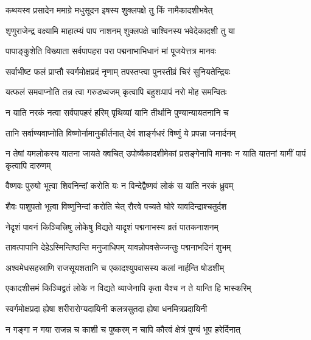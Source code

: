 \label{sec:padma-ashvina-shukla-pashankusha}



\twolineshloka
{कथयस्व प्रसादेन ममाग्रे मधुसूदन}
{इषस्य शुक्लपक्षे तु किं नामैकादशीभवेत्}%


\twolineshloka
{शृणुराजेन्द्र वक्ष्यामि माहात्म्यं पाप नाशनम्}
{शुक्लपक्षे चाश्विनस्य भवेदेकादशी तु या}%

\twolineshloka
{पापाङ्कुशेति विख्याता सर्वपापहरा परा}
{पद्मनाभाभिधानं मां पूजयेत्तत्र मानवः}%

\twolineshloka
{सर्वाभीष्ट फलं प्राप्तौ स्वर्गमोक्षप्रदं नृणाम्}
{तपस्तप्त्वा पुनस्तीव्रं चिरं सुनियतेन्द्रियः}%

\twolineshloka
{यत्फलं समवाप्नोति तन्न त्वा गरुडध्वजम्}
{कृत्वापि बहुशःपापं नरो मोह समन्वितः}%

\twolineshloka
{न याति नरकं नत्वा सर्वपापहरं हरिम्}
{पृथिव्यां यानि तीर्थानि पुण्यान्यायतनानि च}%

\twolineshloka
{तानि सर्वाण्यवाप्नोति विष्णोर्नामानुकीर्तनात्}
{देवं शार्ङ्गधरं विष्णुं ये प्रपन्ना जनार्दनम्}%

\threelineshloka
{न तेषां यमलोकस्य यातना जायते क्वचित्}
{उपोष्यैकादशीमेकां प्रसङ्गेनापि मानवः}
{न याति यातनां यामीं पापं कृत्वापि दारुणम्}%

\twolineshloka
{वैष्णवः पुरुषो भूत्वा शिवनिन्दां करोति यः}
{न विन्देद्वैष्णवं लोकं स याति नरकं ध्रुवम्}%

\twolineshloka
{शैवः पाशुपतो भूत्वा विष्णुनिन्दां करोति चेत्}
{रौरवे पच्यते घोरे यावदिन्द्राश्चतुर्दश}%

\twolineshloka
{नेदृशं पावनं किञ्चित्त्रिषु लोकेषु विद्यते}
{यादृशं पद्मनाभस्य व्रतं पातकनाशनम्}%

\twolineshloka
{तावत्पापानि देहेऽस्मिन्तिष्ठन्ति मनुजाधिपम्}
{यावन्नोपवसेज्जन्तुः पद्मनाभदिनं शुभम्}%

\twolineshloka
{अश्वमेधसहस्राणि राजसूयशतानि च}
{एकादश्युपवासस्य कलां नार्हन्ति षोडशीम्}%

\twolineshloka
{एकादशीसमं किञ्चिद्व्रतं लोके न विद्यते}
{व्याजेनापि कृता यैश्च न ते यान्ति हि भास्करिम्}%

\twolineshloka
{स्वर्गमोक्षप्रदा ह्येषा शरीरारोग्यदायिनी}
{कलत्रसुतदा ह्येषा धनमित्रप्रदायिनी}%

\twolineshloka
{न गङ्गा न गया राजन्न च काशी च पुष्करम्}
{न चापि कौरवं क्षेत्रं पुण्यं भूप हरेर्दिनात्}%

